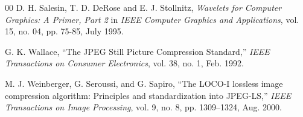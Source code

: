 \begin{thebibliography}{00}
D. H. Salesin, T. D. DeRose and E. J. Stollnitz, \emph{Wavelets for Computer Graphics: A Primer, Part 2} in \emph{IEEE Computer Graphics and Applications}, vol. 15, no. 04, pp. 75-85, July 1995.

G. K. Wallace, ``The JPEG Still Picture Compression Standard,'' \emph{IEEE Transactions on Consumer Electronics}, vol. 38, no. 1, Feb. 1992.

M. J. Weinberger, G. Seroussi, and G. Sapiro, ``The LOCO-I lossless image compression algorithm: Principles and standardization into JPEG-LS,'' \emph{IEEE Transactions on Image Processing}, vol. 9, no. 8, pp. 1309--1324, Aug. 2000.

\end{thebibliography}